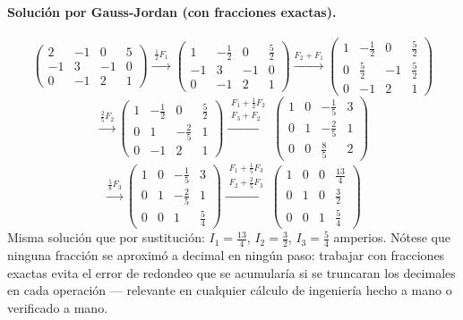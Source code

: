 \documentclass[11pt,letterpaper]{article}
\theoremstyle{definition}
\theoremstyle{plain}
\begin{document}
\paragraph{Solución por Gauss-Jordan (con fracciones exactas).}
\[
  \left(\begin{array}{ccc|c} 2&-1&0&5\\ -1&3&-1&0\\ 0&-1&2&1 \end{array}\right)
  \xrightarrow{\;\frac{1}{2}F_1\;}
  \left(\begin{array}{ccc|c} 1&-\tfrac{1}{2}&0&\tfrac{5}{2}\\ -1&3&-1&0\\ 0&-1&2&1 \end{array}\right)
  \xrightarrow{F_2+F_1}
  \left(\begin{array}{ccc|c} 1&-\tfrac{1}{2}&0&\tfrac{5}{2}\\ 0&\tfrac{5}{2}&-1&\tfrac{5}{2}\\ 0&-1&2&1 \end{array}\right)
\]
\[
  \xrightarrow{\frac{2}{5}F_2}
  \left(\begin{array}{ccc|c} 1&-\tfrac{1}{2}&0&\tfrac{5}{2}\\ 0&1&-\tfrac{2}{5}&1\\ 0&-1&2&1 \end{array}\right)
  \xrightarrow{\substack{F_1+\frac{1}{2}F_2 \\ F_3+F_2}}
  \left(\begin{array}{ccc|c} 1&0&-\tfrac{1}{5}&3\\ 0&1&-\tfrac{2}{5}&1\\ 0&0&\tfrac{8}{5}&2 \end{array}\right)
\]
\[
  \xrightarrow{\frac{5}{8}F_3}
  \left(\begin{array}{ccc|c} 1&0&-\tfrac{1}{5}&3\\ 0&1&-\tfrac{2}{5}&1\\ 0&0&1&\tfrac{5}{4} \end{array}\right)
  \xrightarrow{\substack{F_1+\frac{1}{5}F_3 \\ F_2+\frac{2}{5}F_3}}
  \left(\begin{array}{ccc|c} 1&0&0&\tfrac{13}{4}\\ 0&1&0&\tfrac{3}{2}\\ 0&0&1&\tfrac{5}{4} \end{array}\right)
\]
Misma solución que por sustitución: $I_1=\tfrac{13}{4}$, $I_2=\tfrac{3}{2}$, $I_3=\tfrac{5}{4}$
amperios. Nótese que ninguna fracción se aproximó a decimal en ningún paso: trabajar con
fracciones exactas evita el error de redondeo que se acumularía si se truncaran los decimales en
cada operación --- relevante en cualquier cálculo de ingeniería hecho a mano o verificado a mano.
\end{document}
